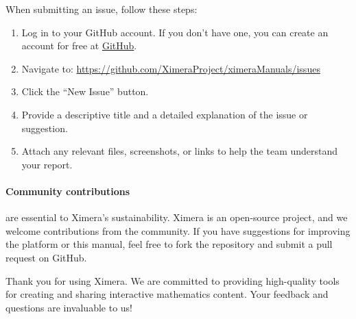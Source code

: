 \documentclass{ximera}
\begin{document}
When submitting an issue, follow these steps:
\begin{enumerate}
    \item Log in to your GitHub account. If you don't have one, you can create
          an account for free at \href{https://github.com}{GitHub}.
    \item Navigate to:
          \url{https://github.com/XimeraProject/ximeraManuals/issues}
    \item Click the ``New Issue'' button.
    \item Provide a descriptive title and a detailed explanation of the issue
          or suggestion.
    \item Attach any relevant files, screenshots, or links to help the team
          understand your report.
\end{enumerate}

\paragraph{Community contributions} are essential to Ximera's sustainability.
Ximera is an open-source project, and we welcome contributions from the
community. If you have suggestions for improving the platform or this manual,
feel free to fork the repository and submit a pull request on GitHub.

Thank you for using Ximera. We are committed to providing high-quality tools
for creating and sharing interactive mathematics content. Your feedback and
questions are invaluable to us!
\end{document}
